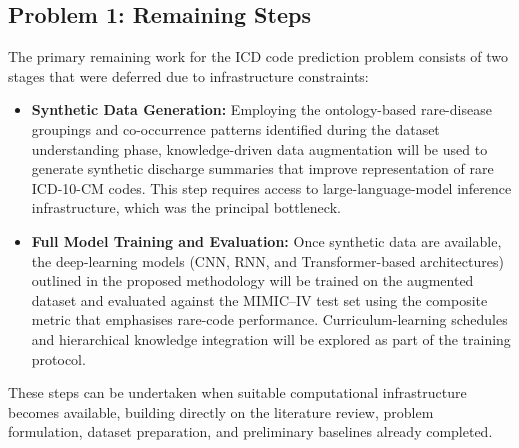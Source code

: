 \subsection{Problem 1: Remaining Steps}\label{sec:fw:p1}
The primary remaining work for the ICD code prediction problem consists of two stages that were deferred due to infrastructure constraints:
\begin{itemize}
    \item \textbf{Synthetic Data Generation:} Employing the ontology-based rare-disease groupings and co-occurrence patterns identified during the dataset understanding phase, knowledge-driven data augmentation will be used to generate synthetic discharge summaries that improve representation of rare ICD-10-CM codes. This step requires access to large-language-model inference infrastructure, which was the principal bottleneck.

    \item \textbf{Full Model Training and Evaluation:} Once synthetic data are available, the deep-learning models (CNN, RNN, and Transformer-based architectures) outlined in the proposed methodology will be trained on the augmented dataset and evaluated against the MIMIC--IV test set using the composite metric that emphasises rare-code performance. Curriculum-learning schedules and hierarchical knowledge integration will be explored as part of the training protocol.
\end{itemize}

\noindent
These steps can be undertaken when suitable computational infrastructure becomes available, building directly on the literature review, problem formulation, dataset preparation, and preliminary baselines already completed.

